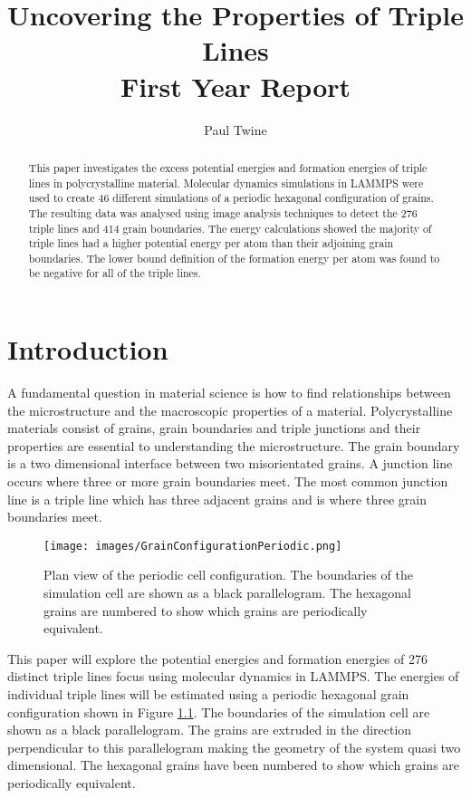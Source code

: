\documentclass[12pt,a4paper,openany]{report}
\begin{document}
\title{Uncovering the Properties of Triple Lines \\
First Year Report}
\author{Paul Twine}
\date{}


\maketitle
\tableofcontents
\listoffigures

\begin{abstract}
This paper investigates the excess potential energies and formation energies of triple lines in polycrystalline material. Molecular dynamics simulations in LAMMPS were used to create 46 different simulations of a periodic hexagonal configuration of grains. The resulting data was analysed using image analysis techniques to detect the 276 triple lines and 414 grain boundaries. The energy calculations showed the majority of triple lines had a higher potential energy per atom than their adjoining grain boundaries. The lower bound definition of the formation energy per atom was found to be negative for all of the triple lines.
\end{abstract}

\chapter{Introduction} \label{ch:Intro}

A fundamental question in material science is how to find relationships between the microstructure and the macroscopic properties of a material. Polycrystalline materials consist of grains, grain boundaries and triple junctions and their properties are essential to understanding the microstructure. The grain boundary is a two dimensional interface between two misorientated grains. A junction line occurs where three or more grain boundaries meet. The most common junction line is a triple line which has three adjacent grains and is where three grain boundaries meet. 

\begin{figure}[H]
	\texttt{[image: images/GrainConfigurationPeriodic.png]} 
	\caption{Plan view of the periodic cell configuration. The boundaries of the simulation cell are shown as a black parallelogram. The hexagonal grains are numbered to show which grains are periodically equivalent.}
	\label{fig:PerCell}
\end{figure}

This paper will explore the potential energies and formation energies of 276 distinct triple lines focus using molecular dynamics in LAMMPS. The energies of individual triple lines will be estimated using a periodic hexagonal grain configuration shown in Figure \ref{fig:PerCell}. The boundaries of the simulation cell are shown as a black parallelogram. The grains are extruded in the direction perpendicular to this parallelogram making the geometry of the system quasi two dimensional. The hexagonal grains have been numbered to show which grains are periodically equivalent.
\end{document}
